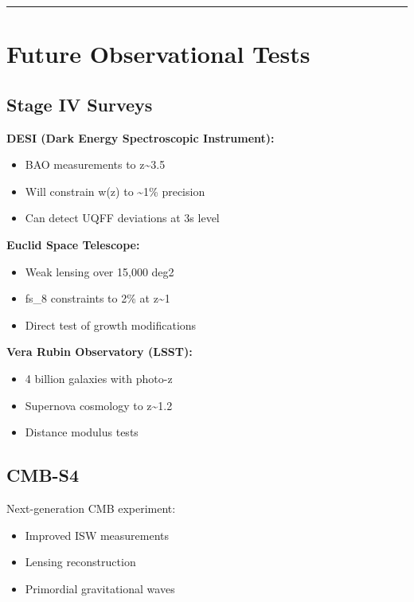\documentclass[12pt,a4paper]{article}
\begin{document}
\medskip\hrule\medskip

\section{Future Observational Tests}

\subsection{Stage IV Surveys}

\textbf{DESI (Dark Energy Spectroscopic Instrument):}

\begin{itemize}
  \item BAO measurements to z\textasciitilde{}3.5
  \item Will constrain w(z) to \textasciitilde{}1\% precision
  \item Can detect UQFF deviations at 3s level
\end{itemize}

\textbf{Euclid Space Telescope:}

\begin{itemize}
  \item Weak lensing over 15,000 deg2
  \item fs\_8 constraints to 2\% at z\textasciitilde{}1
  \item Direct test of growth modifications
\end{itemize}

\textbf{Vera Rubin Observatory (LSST):}

\begin{itemize}
  \item 4 billion galaxies with photo-z
  \item Supernova cosmology to z\textasciitilde{}1.2
  \item Distance modulus tests
\end{itemize}

\subsection{CMB-S4}

Next-generation CMB experiment:

\begin{itemize}
  \item Improved ISW measurements
  \item Lensing reconstruction
  \item Primordial gravitational waves
\end{itemize}
\end{document}
